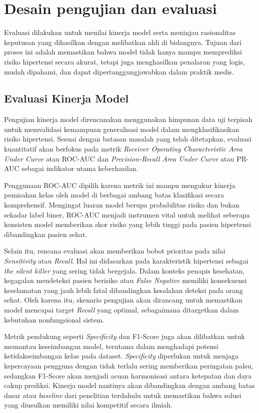 \section{Desain pengujian dan evaluasi}
Evaluasi dilakukan untuk menilai kinerja model serta meninjau rasionalitas keputusan yang dihasilkan dengan melibatkan ahli di bidangnya. Tujuan dari proses ini adalah memastikan bahwa model tidak hanya mampu memprediksi risiko hipertensi secara akurat, tetapi juga menghasilkan penalaran yang logis, mudah dipahami, dan dapat dipertanggungjawabkan dalam praktik medis.

\subsection{Evaluasi Kinerja Model}
Pengujian kinerja model direncanakan menggunakan himpunan data uji terpisah untuk memvalidasi kemampuan generalisasi model dalam mengklasifikasikan risiko hipertensi. Sesuai dengan batasan masalah yang telah ditetapkan, evaluasi kuantitatif akan berfokus pada metrik \textit{Receiver Operating Characteristic Area Under Curve} atau ROC-AUC dan \textit{Precision-Recall Area Under Curve} atau PR-AUC sebagai indikator utama keberhasilan.

Penggunaan ROC-AUC dipilih karena metrik ini mampu mengukur kinerja pemisahan kelas oleh model di berbagai ambang batas klasifikasi secara komprehensif. Mengingat luaran model berupa probabilitas risiko dan bukan sekadar label biner, ROC-AUC menjadi instrumen vital untuk melihat seberapa konsisten model memberikan skor risiko yang lebih tinggi pada pasien hipertensi dibandingkan pasien sehat.

Selain itu, rencana evaluasi akan memberikan bobot prioritas pada nilai \textit{Sensitivity} atau \textit{Recall}. Hal ini didasarkan pada karakteristik hipertensi sebagai \textit{the silent killer} yang sering tidak bergejala. Dalam konteks penapis kesehatan, kegagalan mendeteksi pasien berisiko atau \textit{False Negative} memiliki konsekuensi keselamatan yang jauh lebih fatal dibandingkan kesalahan deteksi pada orang sehat. Oleh karena itu, skenario pengujian akan dirancang untuk memastikan model mencapai target \textit{Recall} yang optimal, sebagaimana ditargetkan dalam kebutuhan nonfungsional sistem.

Metrik pendukung seperti \textit{Specificity} dan F1-Score juga akan dilibatkan untuk memantau keseimbangan model, terutama dalam menghadapi potensi ketidakseimbangan kelas pada dataset. \textit{Specificity} diperlukan untuk menjaga kepercayaan pengguna dengan tidak terlalu sering memberikan peringatan palsu, sedangkan F1-Score akan menjadi acuan harmonisasi antara ketepatan dan daya cakup prediksi. Kinerja model nantinya akan dibandingkan dengan ambang batas dasar atau \textit{baseline} dari penelitian terdahulu untuk memastikan bahwa solusi yang diusulkan memiliki nilai kompetitif secara ilmiah.


